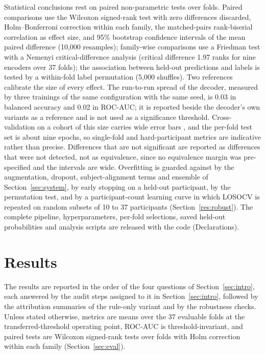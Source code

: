 \documentclass[pdflatex,sn-basic,Numbered,twocolumn,iicol]{sn-jnl}
\theoremstyle{thmstyleone}%
\theoremstyle{thmstyletwo}%
\theoremstyle{thmstylethree}%
\begin{document}
Statistical conclusions rest on paired non-parametric tests over folds. Paired comparisons use the Wilcoxon signed-rank test with zero differences discarded, Holm--Bonferroni correction within each family, the matched-pairs rank-biserial correlation as effect size, and 95\% bootstrap confidence intervals of the mean paired difference (10{,}000 resamples); family-wise comparisons use a Friedman test with a Nemenyi critical-difference analysis (critical difference 1.97 ranks for nine encoders over 37 folds); the association between held-out predictions and labels is tested by a within-fold label permutation (5{,}000 shuffles). Two references calibrate the size of every effect. The run-to-run spread of the decoder, measured by three trainings of the same configuration with the same seed, is 0.03 in balanced accuracy and 0.02 in ROC-AUC; it is reported beside the decoder's own variants as a reference and is not used as a significance threshold. Cross-validation on a cohort of this size carries wide error bars \cite{ref63}, and the per-fold test set is about nine epochs, so single-fold and hard-participant metrics are indicative rather than precise. Differences that are not significant are reported as differences that were not detected, not as equivalence, since no equivalence margin was pre-specified and the intervals are wide. Overfitting is guarded against by the augmentation, dropout, subject-alignment terms and ensemble of Section~\ref{sec:system}, by early stopping on a held-out participant, by the permutation test, and by a participant-count learning curve in which LOSOCV is repeated on random subsets of 10 to 37 participants (Section~\ref{res:robust}). The complete pipeline, hyperparameters, per-fold selections, saved held-out probabilities and analysis scripts are released with the code (Declarations).

\section{Results}\label{sec:results}

The results are reported in the order of the four questions of Section~\ref{sec:intro}, each answered by the audit steps assigned to it in Section~\ref{sec:intro}, followed by the attribution summaries of the rule-only variant and by the robustness checks. Unless stated otherwise, metrics are means over the 37 evaluable folds at the transferred-threshold operating point, ROC-AUC is threshold-invariant, and paired tests are Wilcoxon signed-rank tests over folds with Holm correction within each family (Section~\ref{sec:eval}).
\end{document}
